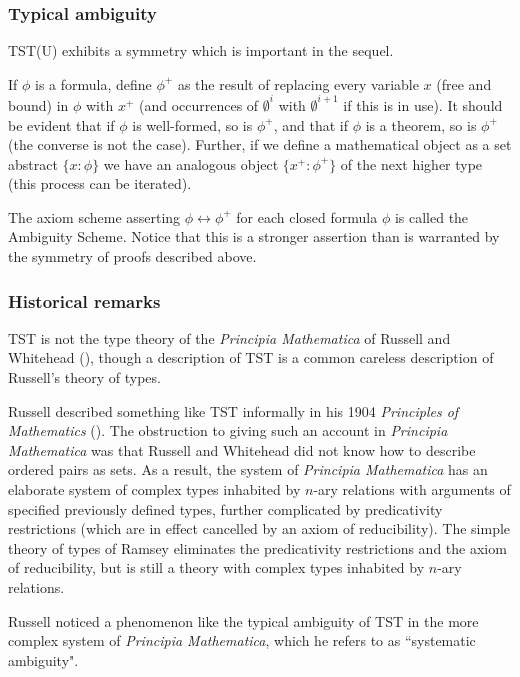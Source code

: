 \documentclass[112pt]{article}
\theoremstyle{definition}
\theoremstyle{remark}
\begin{document}
\subsubsection{Typical ambiguity}

TST(U) exhibits a symmetry which is important in the sequel.



If $\phi$ is a formula, define $\phi^+$ as the result of replacing every variable $x$ (free and bound) in $\phi$ with $x^+$ (and occurrences of $\emptyset^i$ with $\emptyset^{i+1}$ if this is in use).   It should be evident that if $\phi$ is well-formed, so is $\phi^+$,
and that if $\phi$ is a theorem, so is $\phi^+$ (the converse is not the case).  Further, if we define a mathematical object as a set abstract $\{x:\phi\}$ we have an analogous
object $\{x^+:\phi^+\}$ of the next higher type (this process can be iterated).

The axiom scheme asserting $\phi \leftrightarrow \phi^+$ for each closed formula $\phi$ is called the Ambiguity Scheme.   Notice that this is a stronger assertion than is warranted by the symmetry of proofs described above.

\subsubsection{Historical remarks}

TST is not the type theory of the {\em Principia Mathematica\/} of Russell and Whitehead (\cite{pm}), though a description of TST is a common careless description of Russell's theory of types.

Russell described something like TST informally in his 1904 {\em Principles of Mathematics\/} (\cite{pm1}).  The obstruction to giving such an account in {\em Principia Mathematica\/} was that
Russell and Whitehead did not know how to describe ordered pairs as sets.  As a result, the system of {\em Principia Mathematica\/} has an elaborate system of  complex
types inhabited by $n$-ary relations with arguments of specified previously defined types, further complicated by predicativity restrictions (which are in effect cancelled by an axiom of reducibility).
The simple theory of types of Ramsey eliminates the predicativity restrictions and the axiom of reducibility, but is still a theory with complex types inhabited by $n$-ary relations.

Russell noticed a phenomenon like the typical ambiguity of TST in the more complex system of {\em Principia Mathematica\/}, which he refers to as ``systematic ambiguity".
\end{document}
